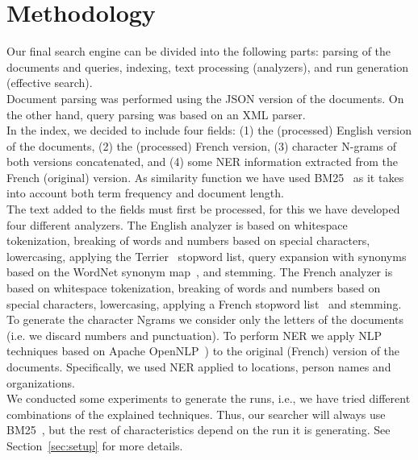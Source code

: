 \section{Methodology}
\label{sec:methodology}

Our final search engine can be divided into the following parts: parsing of the documents and queries, indexing,
text processing (analyzers), and run generation (effective search).\\

Document parsing was performed using the JSON version of the documents.
On the other hand, query parsing was based on an XML parser.\\

In the index, we decided to include four fields: (1) the (processed) English version of the documents, (2) the
(processed) French version, (3) character N-grams of both versions concatenated, and (4) some NER information extracted
from the French (original) version.
As similarity function we have used BM25~\cite{BM25} as it takes into account both term frequency and document length.\\

The text added to the fields must first be processed, for this we have developed four different analyzers.
The English analyzer is based on whitespace tokenization, breaking of words and numbers based on special characters,
lowercasing, applying the Terrier~\cite{OunisEtAl2006} stopword list, query expansion with synonyms based on
the WordNet synonym map~\cite{wordnet}, and stemming.
The French analyzer is based on whitespace tokenization, breaking of words and numbers based on special characters,
lowercasing, applying a French stopword list~\cite{stopword_french} and stemming.
To generate the character N\-grams we consider only the letters of the documents (i.e. we discard numbers and
punctuation).
To perform NER we apply NLP techniques based on Apache OpenNLP~\cite{ApacheOpenNLP}) to the original (French) version of
the documents.
Specifically, we used NER applied to locations, person names and organizations.\\

We conducted some experiments to generate the runs, i.e., we have tried different combinations of the explained
techniques.
Thus, our searcher will always use BM25~\cite{BM25}, but the rest of characteristics depend on the run it is generating.
See Section~\ref{sec:setup} for more details.